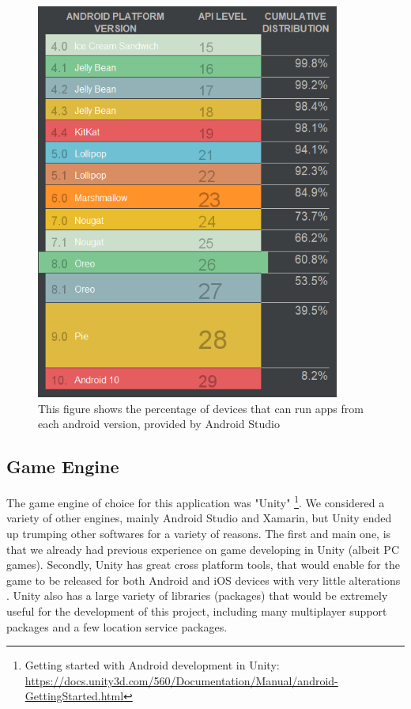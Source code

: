 \documentclass{dissertation}
\begin{document}
\begin{figure}[H]
\centering
\includegraphics[width = 10cm]{images/android-versions.png}
\caption{This figure shows the percentage of devices that can run apps from each android version, provided by Android Studio}
\label{fig:android-version}
\end{figure}

\subsection{Game Engine}
The game engine of choice for this application was "Unity" \footnote{Getting started with Android development in Unity: \url{https://docs.unity3d.com/560/Documentation/Manual/android-GettingStarted.html}}. We considered a variety of other engines, mainly Android Studio and Xamarin, but Unity ended up trumping other softwares for a variety of reasons. The first and main one, is that we already had previous experience on game developing in Unity (albeit PC games). Secondly, Unity has great cross platform tools, that would enable for the game to be released for both Android and iOS devices with very little alterations \citep{Sinicki20}. Unity also has a large variety of libraries (packages) that would be extremely useful for the development of this project, including many multiplayer support packages and a few location service packages. 
\end{document}
